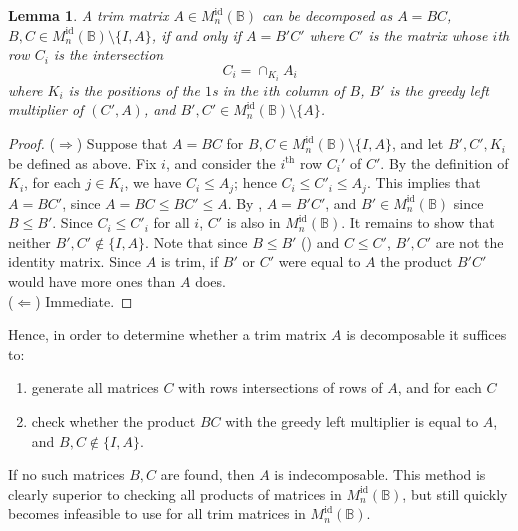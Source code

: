 \documentclass[11pt]{article}
\newtheorem{lemma}[thm]{Lemma}
\numberwithin{equation}{section}
\newcommand{\B}{\mathbb{B}}
\newcommand{\Refn}{M_n^{\text{id}}(\B)}
\begin{document}
\begin{lemma}
  A trim matrix $A \in \Refn$ can be decomposed as $A = BC$, $B, C \in
  \Refn\setminus\{I, A\}$, if and only if $A = B'C'$ where $C'$ is the matrix
  whose $i$th row $C_i$ is the intersection 
  \[ C_i = \cap_{K_i} A_i \]
  where $K_i$ is the positions of the $1$s in the $i$th column of $B$, $B'$ is
  the greedy left multiplier of $(C', A)$, and $B', C' \in \Refn
  \setminus\{A\}$.
\end{lemma}
\begin{proof}
  ($\Rightarrow$)
  Suppose that $A = BC$ for $B, C \in \Refn \setminus\{I, A\}$, and let $B', C',
  K_i$ be defined as above. Fix $i$, and consider the $i^{\text{th}}$ row $C_i'$
  of $C'$. By the definition of $K_i$, for each $j \in K_i$, we have $C_i \leq
  A_j$; hence $C_i \leq C'_i \leq A_j$. This implies that $A = BC'$, since $A =
  BC \leq BC' \leq A$. By , $A = B'C'$, and $B' \in
  \Refn$ since $B \leq B'$. Since $C_i \leq C'_i$ for all $i$, $C'$ is also in
  $\Refn$. It remains to show that neither $B', C' \not\in \{I, A\}$. Note
  that since $B \leq B'$ () and $C \leq C'$, $B', C'$
  are not the identity matrix. Since $A$ is trim, if $B'$ or $C'$ were equal
  to $A$ the product $B'C'$ would have more ones than $A$ does.\\
  ($\Leftarrow$) Immediate.
\end{proof}
Hence, in order to determine whether a trim matrix $A$ is decomposable it
suffices to:
\begin{enumerate}
  \item generate all matrices $C$ with rows intersections of rows of $A$, and
    for each $C$
  \item check whether the product $BC$ with the greedy left multiplier is equal
    to $A$, and $B, C \not\in \{I, A\}$.
\end{enumerate}
If no such matrices $B, C$ are found, then $A$ is indecomposable. This method is
clearly superior to checking all products of matrices in $\Refn$, but still
quickly becomes infeasible to use for all trim matrices in $\Refn$.\\
\end{document}
